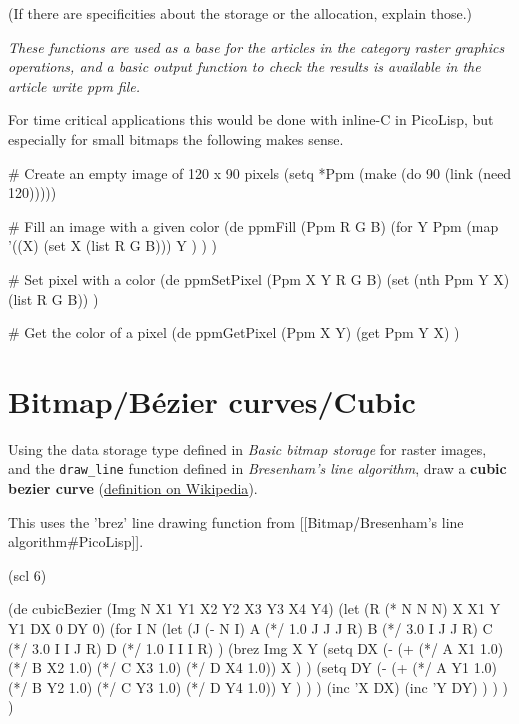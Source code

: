 (If there are specificities about the storage or the allocation, explain
those.)

\emph{These functions are used as a base for the articles in the
  category \emph{raster graphics operations}, and a basic output
  function to check the results is available in the article
  \emph{write ppm file}.}

\begin{wideverbatim}

For time critical applications this would be done with inline-C in PicoLisp,
but especially for small bitmaps the following makes sense.

# Create an empty image of 120 x 90 pixels
(setq *Ppm (make (do 90 (link (need 120)))))

# Fill an image with a given color
(de ppmFill (Ppm R G B)
   (for Y Ppm
      (map
         '((X) (set X (list R G B)))
         Y ) ) )

# Set pixel with a color
(de ppmSetPixel (Ppm X Y R G B)
   (set (nth Ppm Y X) (list R G B)) )

# Get the color of a pixel
(de ppmGetPixel (Ppm X Y)
   (get Ppm Y X) )

\end{wideverbatim}

\pagebreak{}
\section*{Bitmap/B\'{e}zier curves/Cubic}


Using the data storage type defined in \emph{Basic bitmap storage}
for raster images, and the \texttt{draw\_line} function defined in
\emph{Bresenham's line algorithm}, draw a \textbf{cubic bezier
  curve}
(\href{http://en.wikipedia.org/wiki/Bezier\_curves\#Cubic\_B.C3.A9zier\_curves}{definition
  on Wikipedia}).

\begin{wideverbatim}

This uses the 'brez' line drawing function from
[[Bitmap/Bresenham's line algorithm#PicoLisp]].

(scl 6)

(de cubicBezier (Img N X1 Y1 X2 Y2 X3 Y3 X4 Y4)
   (let (R (* N N N)  X X1  Y Y1  DX 0  DY 0)
      (for I N
         (let
            (J (- N I)
               A (*/ 1.0 J J J R)
               B (*/ 3.0 I J J R)
               C (*/ 3.0 I I J R)
               D (*/ 1.0 I I I R) )
            (brez Img
               X
               Y
               (setq DX
                  (-
                     (+ (*/ A X1 1.0) (*/ B X2 1.0) (*/ C X3 1.0) (*/ D X4 1.0))
                     X ) )
               (setq DY
                  (-
                     (+ (*/ A Y1 1.0) (*/ B Y2 1.0) (*/ C Y3 1.0) (*/ D Y4 1.0))
                     Y ) ) )
            (inc 'X DX)
            (inc 'Y DY) ) ) ) )

\end{wideverbatim}

